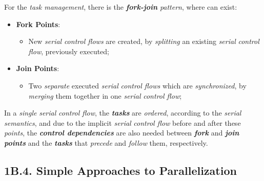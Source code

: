 \newpage

\noindent For the \emph{task management}, there is the \textbf{\emph{fork-join}} \emph{pattern}, where can exist:
\begin{itemize}
    \vspace{-0.2cm}
    \item \textbf{Fork Points}:
    \vspace{-0.2cm}
    \begin{itemize}
        \item New \emph{serial} \emph{control flows} are created, by \emph{splitting} an existing \emph{serial} \emph{control flow}, previously executed;
    \end{itemize}
    \vspace{-0.2cm}
    \item \textbf{Join Points}:
    \vspace{-0.2cm}
    \begin{itemize}
        \item Two \emph{separate} executed \emph{serial} \emph{control flows} which are \emph{synchronized}, by \emph{merging} them together in one \emph{serial} \emph{control flow};
    \end{itemize}
\end{itemize}

\noindent In a \emph{single} \emph{serial} \emph{control flow}, the \textbf{\emph{tasks}} are \emph{ordered}, according to the \emph{serial semantics}, and due to the implicit \emph{serial} \emph{control flow} before and after these \emph{points}, the \textbf{\emph{control dependencies}} are also needed between \textbf{\emph{fork}} and \textbf{\emph{join}} \textbf{\emph{points}} and the \textbf{\emph{tasks}} that \emph{precede} and \emph{follow} them, respectively.

\vspace{0.5cm}

\subsection*{\large{\textbf{1B.4. Simple Approaches to Parallelization}}}
\label{ssec:lecture-1B4}

